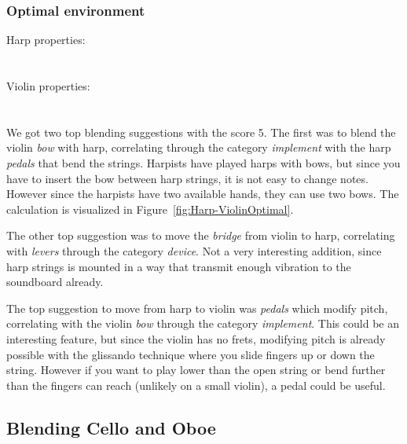 \subsubsection{Optimal environment}
Harp properties:\\
\noindent{}
\\\\Violin properties:\\
\noindent{}
\\\\We got two top blending suggestions with the score 5. The first was to blend the violin \emph{bow} with harp, correlating through the category \emph{implement} with the harp \emph{pedals} that bend the strings. Harpists have played harps with bows, but since you have to insert the bow between harp strings, it is not easy to change notes. However since the harpists have two available hands, they can use two bows. The calculation is visualized in Figure~\ref{fig:Harp-ViolinOptimal}.

The other top suggestion was to move the \emph{bridge} from violin to harp, correlating with \emph{levers} through the category \emph{device}. Not a very interesting addition, since harp strings is mounted in a way that transmit enough vibration to the soundboard already.

The top suggestion to move from harp to violin was \emph{pedals} which modify pitch, correlating with the violin \emph{bow} through the category \emph{implement}. This could be an interesting feature, but since the violin has no frets, modifying pitch is already possible with the glissando technique where you slide fingers up or down the string. However if you want to play lower than the open string or bend further than the fingers can reach (unlikely on a small violin), a pedal could be useful.

\subsection{Blending Cello and Oboe}

